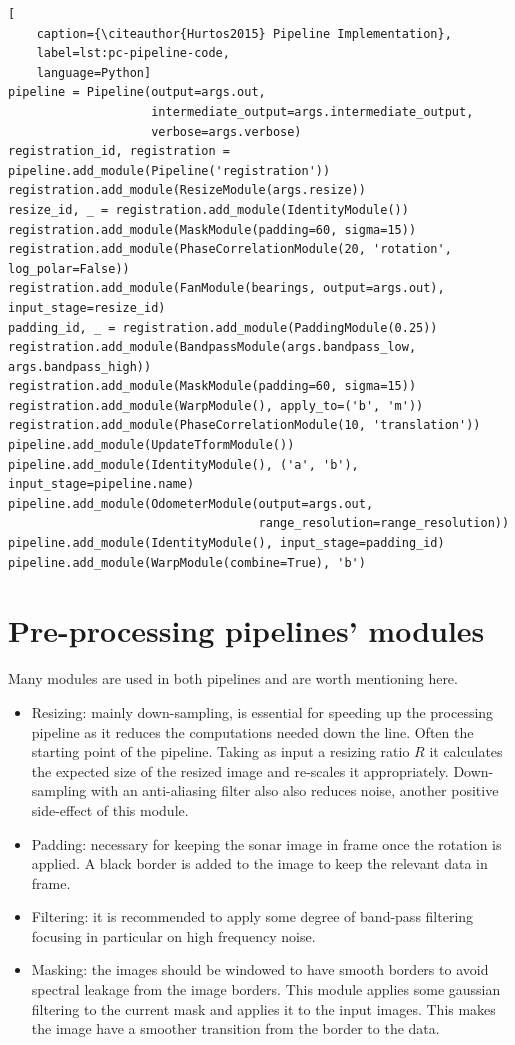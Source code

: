 \begin{lstlisting}[
    caption={\citeauthor{Hurtos2015} Pipeline Implementation},
    label=lst:pc-pipeline-code,
    language=Python]
pipeline = Pipeline(output=args.out, 
                    intermediate_output=args.intermediate_output, 
                    verbose=args.verbose)
registration_id, registration = pipeline.add_module(Pipeline('registration'))
registration.add_module(ResizeModule(args.resize))
resize_id, _ = registration.add_module(IdentityModule())
registration.add_module(MaskModule(padding=60, sigma=15))
registration.add_module(PhaseCorrelationModule(20, 'rotation', log_polar=False))
registration.add_module(FanModule(bearings, output=args.out), input_stage=resize_id)
padding_id, _ = registration.add_module(PaddingModule(0.25))
registration.add_module(BandpassModule(args.bandpass_low, args.bandpass_high))
registration.add_module(MaskModule(padding=60, sigma=15))
registration.add_module(WarpModule(), apply_to=('b', 'm'))
registration.add_module(PhaseCorrelationModule(10, 'translation'))
pipeline.add_module(UpdateTformModule())
pipeline.add_module(IdentityModule(), ('a', 'b'), input_stage=pipeline.name)
pipeline.add_module(OdometerModule(output=args.out, 
                                   range_resolution=range_resolution))
pipeline.add_module(IdentityModule(), input_stage=padding_id)
pipeline.add_module(WarpModule(combine=True), 'b')
\end{lstlisting}



\section{Pre-processing pipelines' modules}

Many modules are used in both pipelines and are worth mentioning here.
\begin{itemize}
    \item Resizing: mainly down-sampling, is essential for speeding up the processing pipeline as it reduces the computations needed down the line. Often the starting point of the pipeline. Taking as input a resizing ratio \(R\) it calculates the expected size of the resized image and re-scales it appropriately. Down-sampling with an anti-aliasing filter also also reduces noise, another positive side-effect of this module.
    \item Padding: necessary for keeping the sonar image in frame once the rotation is applied. A black border is added to the image to keep the relevant data in frame.
    \item Filtering: it is recommended to apply some degree of band-pass filtering focusing in particular on high frequency noise.
    \item Masking: the images should be windowed to have smooth borders to avoid spectral leakage from the image borders. This module applies some gaussian filtering to the current mask and applies it to the input images. This makes the image have a smoother transition from the border to the data.
\end{itemize}


